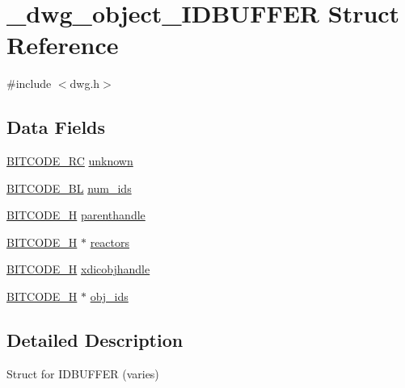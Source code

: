 \hypertarget{struct__dwg__object__IDBUFFER}{\section{\-\_\-dwg\-\_\-object\-\_\-\-I\-D\-B\-U\-F\-F\-E\-R \-Struct \-Reference}
\label{struct__dwg__object__IDBUFFER}
}


{\ttfamily \#include $<$dwg.\-h$>$}

\subsection*{\-Data \-Fields}
\begin{DoxyCompactItemize}
\item 
\hyperlink{dwg_8h_a7fd199a8f9c9cc52bdab220f65a2a619}{\-B\-I\-T\-C\-O\-D\-E\-\_\-\-R\-C} \hyperlink{struct__dwg__object__IDBUFFER_ae1b33edb48d367e2097274adfde1340c}{unknown}
\item 
\hyperlink{dwg_8h_aebd5f127038868cbabc3d55d91da776c}{\-B\-I\-T\-C\-O\-D\-E\-\_\-\-B\-L} \hyperlink{struct__dwg__object__IDBUFFER_a787e40edf59fdf33ccdb83a7f0b38f1a}{num\-\_\-ids}
\item 
\hyperlink{dwg_8h_a7c700e94e047a97ba8c24bdfe4029dc3}{\-B\-I\-T\-C\-O\-D\-E\-\_\-\-H} \hyperlink{struct__dwg__object__IDBUFFER_af3de10241801de9a2fbe23af039d630d}{parenthandle}
\item 
\hyperlink{dwg_8h_a7c700e94e047a97ba8c24bdfe4029dc3}{\-B\-I\-T\-C\-O\-D\-E\-\_\-\-H} $\ast$ \hyperlink{struct__dwg__object__IDBUFFER_a6bc4f53676ea143ae11567e09d3e500a}{reactors}
\item 
\hyperlink{dwg_8h_a7c700e94e047a97ba8c24bdfe4029dc3}{\-B\-I\-T\-C\-O\-D\-E\-\_\-\-H} \hyperlink{struct__dwg__object__IDBUFFER_a543da78f67c665b1e41480c772708a8c}{xdicobjhandle}
\item 
\hyperlink{dwg_8h_a7c700e94e047a97ba8c24bdfe4029dc3}{\-B\-I\-T\-C\-O\-D\-E\-\_\-\-H} $\ast$ \hyperlink{struct__dwg__object__IDBUFFER_a0f2e7eeca3d30cffbe58e274aa34510b}{obj\-\_\-ids}
\end{DoxyCompactItemize}


\subsection{\-Detailed \-Description}
\-Struct for \-I\-D\-B\-U\-F\-F\-E\-R (varies) 

